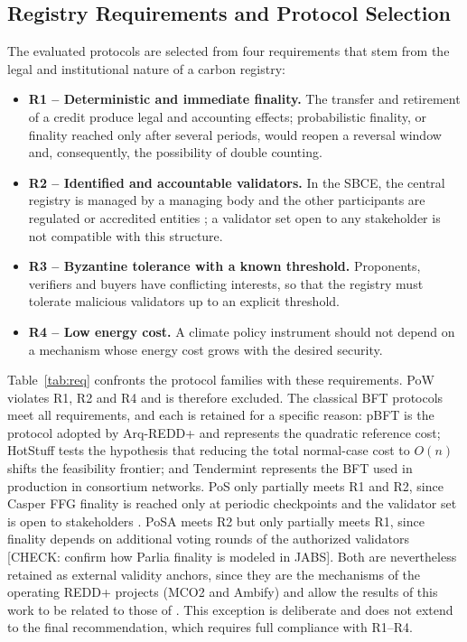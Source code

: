 \documentclass[english]{sbc2025}%
\newcommand{\chk}[1]{\textcolor{orange!80!black}{[CHECK: #1]}}
\begin{document}
\subsection{Registry Requirements and Protocol Selection}

The evaluated protocols are selected from four requirements that stem from the legal and institutional nature of a carbon registry:

\begin{itemize}
\item \textbf{R1 -- Deterministic and immediate finality.} The transfer and retirement of a credit produce legal and accounting effects; probabilistic finality, or finality reached only after several periods, would reopen a reversal window and, consequently, the possibility of double counting.
\item \textbf{R2 -- Identified and accountable validators.} In the SBCE, the central registry is managed by a managing body and the other participants are regulated or accredited entities \citep{Lei15042}; a validator set open to any stakeholder is not compatible with this structure.
\item \textbf{R3 -- Byzantine tolerance with a known threshold.} Proponents, verifiers and buyers have conflicting interests, so that the registry must tolerate malicious validators up to an explicit threshold.
\item \textbf{R4 -- Low energy cost.} A climate policy instrument should not depend on a mechanism whose energy cost grows with the desired security.
\end{itemize}

Table~\ref{tab:req} confronts the protocol families with these requirements. PoW violates R1, R2 and R4 and is therefore excluded. The classical BFT protocols meet all requirements, and each is retained for a specific reason: pBFT is the protocol adopted by Arq-REDD+ and represents the quadratic reference cost; HotStuff tests the hypothesis that reducing the total normal-case cost to $O(n)$ shifts the feasibility frontier; and Tendermint represents the BFT used in production in consortium networks. PoS only partially meets R1 and R2, since Casper FFG finality is reached only at periodic checkpoints and the validator set is open to stakeholders \citep{Buterin2017}. PoSA meets R2 but only partially meets R1, since finality depends on additional voting rounds of the authorized validators \chk{confirm how Parlia finality is modeled in JABS}. Both are nevertheless retained as external validity anchors, since they are the mechanisms of the operating REDD+ projects (MCO2 and Ambify) and allow the results of this work to be related to those of \citep{Caburlao2026clei}. This exception is deliberate and does not extend to the final recommendation, which requires full compliance with R1--R4.
\end{document}
